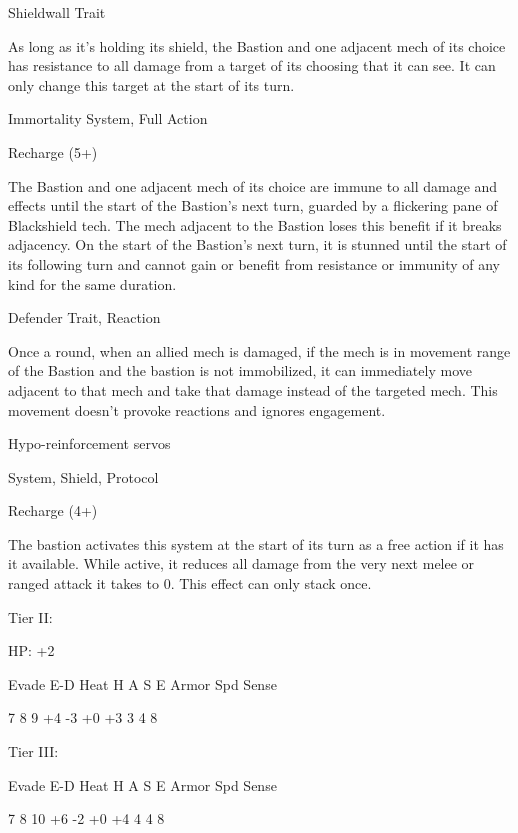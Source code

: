 Shieldwall
Trait

As long as it’s holding its shield, the Bastion and one adjacent mech of its choice has resistance
to all damage from a target of its choosing that it can see. It can only change this target at the
start of its turn.


Immortality
System, Full Action

Recharge (5+)

The Bastion and one adjacent mech of its choice are immune to all damage and effects until the
start of the Bastion’s next turn, guarded by a flickering pane of Blackshield tech. The mech
adjacent to the Bastion loses this benefit if it breaks adjacency. On the start of the Bastion’s next
turn, it is stunned until the start of its following turn and cannot gain or benefit from resistance or
immunity of any kind for the same duration.


Defender
Trait, Reaction

Once a round, when an allied mech is damaged, if the mech is in movement range of the Bastion
and the bastion is not immobilized, it can immediately move adjacent to that mech and take that
damage instead of the targeted mech. This movement doesn't provoke reactions and ignores
engagement.


Hypo-reinforcement servos

System, Shield, Protocol

Recharge (4+)

The bastion activates this system at the start of its turn as a free action if it has it available. While
active, it reduces all damage from the very next melee or ranged attack it takes to 0. This effect
can only stack once.


Tier II:

HP: +2


          Evade     E-D    Heat    H     A     S     E       Armor        Spd      Sense

          7         8      9       +4    -3    +0   +3       3            4        8

Tier III:

          Evade     E-D    Heat    H     A     S     E       Armor        Spd      Sense

          7         8      10      +6    -2    +0   +4       4            4        8
